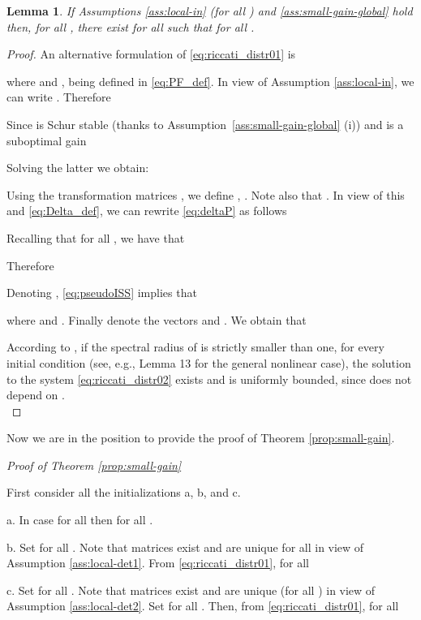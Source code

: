 \documentclass[journal,10pt,draftcls,onecolumn]{IEEEtran}
\newtheorem{lemma}{Lemma}
\newtheorem{proof}{Proof}
\begin{document}
\begin{lemma}
\label{lemma:riccati:boundedness_small-gain}
If Assumptions \ref{ass:local-in} (for all ) and \ref{ass:small-gain-global} hold then, for all  ,
there exist  for all  such that  for all .
\end{lemma}
\begin{proof}
An alternative formulation of \eqref{eq:riccati_distr01} is

where  and , being  defined in \eqref{eq:PF_def}.
In view of Assumption \ref{ass:local-in}, we can write . Therefore

Since  is Schur stable (thanks to Assumption~\ref{ass:small-gain-global} (i)) and  is a suboptimal gain

Solving the latter we obtain:

Using the transformation matrices , we define
,  .
Note also that .
In view of this and \eqref{eq:Delta_def}, we can rewrite \eqref{eq:deltaP} as follows

Recalling that  for all , we have that

Therefore

Denoting , \eqref{eq:pseudoISS} implies that

where  and . Finally denote the vectors  and . We obtain that

According to \cite{Wirth-Small-gain07}, if the spectral radius of  is strictly smaller than one, for every initial condition (see, e.g., Lemma 13 for the general nonlinear case), the solution to the system \eqref{eq:riccati_distr02} exists and is uniformly bounded, since  does not depend on .\hfill{}\\
\end{proof}

\medskip
Now we are in the position to provide the proof of Theorem \ref{prop:small-gain}.

\medskip

\emph{Proof of Theorem \ref{prop:small-gain}}

\medskip
First consider all the initializations a, b, and c.

\medskip
a. In case  for all  then  for all .

\medskip
b. Set  for all .
Note that matrices  exist and are unique for all  in view of Assumption \ref{ass:local-det1}.
From \eqref{eq:riccati_distr01}, for all 



\medskip
c. Set  for all .
Note that matrices  exist and are unique (for all ) in view of Assumption \ref{ass:local-det2}.
Set  for all . Then, from \eqref{eq:riccati_distr01}, for all 
\end{document}
